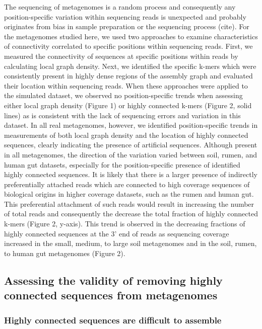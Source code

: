 \documentclass[10pt]{article}
\begin{document}
The sequencing of metagenomes is a random
process and consequently any position-specific variation within sequencing
reads is unexpected and probably originates from bias in sample preparation
or the sequencing process (cite).  For the metagenomes
studied here, we used two approaches to examine characteristics of
connectivity correlated to specific positions within sequencing reads.
First, we measured the connectivity of sequences at specific positions
within reads by calculating local graph density.  Next, we identified
the specific k-mers which were consistently present in highly dense
regions of the assembly graph and evaluated their location within
sequencing reads.  When these approaches were applied to the simulated
dataset, we observed no position-specific trends when assessing either
local graph density (Figure 1) or highly connected k-mers (Figure 2,
solid lines) as is consistent with the lack of sequencing errors and
variation in this dataset.  In all real metagenomes, however, we
identified position-specific trends in measurements of both local
graph density and the location of highly connected sequences, clearly
indicating the presence of artificial sequences.  Although present in
all metagenomes, the direction of the variation varied between soil, rumen,
and human gut datasets, especially for the position-specific presence
of identified highly connected sequences.  It is likely that there is
a larger presence of indirectly preferentially attached reads which
are connected to high coverage sequences of biological origins in
higher coverage datasets, such as the rumen and human gut.  This
preferential attachment of such reads would result in increasing the
number of total reads and consequently the decrease the total fraction
of highly connected k-mers (Figure 2, y-axis).  This trend is observed
in the decreasing fractions of highly connected sequences at the 3'
end of reads as sequencing coverage increased in the small, medium, to
large soil metagenomes and in the soil, rumen, to human gut
metagenomes (Figure 2).

\subsection*{Assessing the validity of removing highly connected sequences from metagenomes}

\subsubsection*{Highly connected sequences are difficult to assemble}
\end{document}
